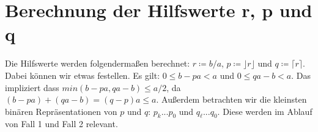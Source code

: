 \section{Berechnung der Hilfswerte r, p und q} \label{helper}
Die Hilfswerte werden folgendermaßen berechnet:
    $r \coloneq b/a$, 
    $p \coloneq \rfloor r \rfloor $ und
    $q \coloneq \lceil r \rceil $.
Dabei können wir etwas festellen. Es gilt: $0 \leq b-pa < a $ und $ 0 \leq qa - b < a $. 
Das impliziert dass $min(b-pa, qa-b) \leq a/2$, da $(b-pa)+(qa-b)=(q-p)a \leq a$. 
Außerdem betrachten wir die kleinsten binären Repräsentationen von $p$ und $q$: $p_k...p_0$ und $q_\ell...q_0$. Diese werden im Ablauf von Fall 1 und Fall 2 relevant.